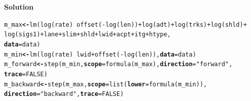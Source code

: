 \documentclass[12pt,oneside,a4paper]{article}\usepackage[]{graphicx}\usepackage[]{xcolor}
\makeatletter
\newcommand{\hlnum}[1]{\textcolor[rgb]{0,0,0}{#1}}%
\newcommand{\hlstr}[1]{\textcolor[rgb]{0,0,1}{#1}}%
\newcommand{\hlopt}[1]{\textcolor[rgb]{0,0,0}{#1}}%
\newcommand{\hlstd}[1]{\textcolor[rgb]{0,0,0}{#1}}%
\newcommand{\hlkwb}[1]{\textcolor[rgb]{0.498,0,0.333}{\textbf{#1}}}%
\newcommand{\hlkwc}[1]{\textcolor[rgb]{0.498,0,0.333}{\textbf{#1}}}%
\newcommand{\hlkwd}[1]{\textcolor[rgb]{0,0,0}{#1}}%
\newenvironment{kframe}{%
 \def\at@end@of@kframe{}%
 \ifinner\ifhmode%
  \def\at@end@of@kframe{\end{minipage}}%
  \begin{minipage}{\columnwidth}%
 \fi\fi%
 \def\FrameCommand##1{\hskip\@totalleftmargin \hskip-\fboxsep
 \colorbox{shadecolor}{##1}\hskip-\fboxsep
     \hskip-\linewidth \hskip-\@totalleftmargin \hskip\columnwidth}%
 \MakeFramed {\advance\hsize-\width
   \@totalleftmargin\z@ \linewidth\hsize
   \@setminipage}}%
 {\par\unskip\endMakeFramed%
 \at@end@of@kframe}
\newenvironment{knitrout}{}{} %
\newcommand{\solution}
{
    \vspace{15pt}
    \noindent\ignorespaces\textbf{\large Solution}\par
}
\makeatother
\begin{document}
\solution
\begin{knitrout}
\color{fgcolor}\begin{kframe}
\begin{alltt}
\hlstd{m_max} \hlkwb{<-} \hlkwd{lm}\hlstd{(}\hlkwd{log}\hlstd{(rate)} \hlopt{~} \hlkwd{offset}\hlstd{(}\hlopt{-}\hlkwd{log}\hlstd{(len))} \hlopt{+} \hlkwd{log}\hlstd{(adt)} \hlopt{+} \hlkwd{log}\hlstd{(trks)} \hlopt{+} \hlkwd{log}\hlstd{(shld)} \hlopt{+}
                \hlkwd{log}\hlstd{(sigs1)} \hlopt{+} \hlstd{lane} \hlopt{+} \hlstd{slim} \hlopt{+} \hlstd{shld} \hlopt{+} \hlstd{lwid} \hlopt{+} \hlstd{acpt} \hlopt{+} \hlstd{itg} \hlopt{+} \hlstd{htype,}
            \hlkwc{data} \hlstd{= data)}
\hlstd{m_min} \hlkwb{<-} \hlkwd{lm}\hlstd{(}\hlkwd{log}\hlstd{(rate)} \hlopt{~} \hlstd{lwid} \hlopt{+} \hlkwd{offset}\hlstd{(}\hlopt{-}\hlkwd{log}\hlstd{(len)),} \hlkwc{data} \hlstd{= data)}
\hlstd{m_forward} \hlkwb{<-} \hlkwd{step}\hlstd{(m_min,} \hlkwc{scope} \hlstd{=} \hlkwd{formula}\hlstd{(m_max),} \hlkwc{direction} \hlstd{=} \hlstr{"forward"}\hlstd{,}
                  \hlkwc{trace} \hlstd{=} \hlnum{FALSE}\hlstd{)}
\hlstd{m_backward} \hlkwb{<-} \hlkwd{step}\hlstd{(m_max,} \hlkwc{scope} \hlstd{=} \hlkwd{list}\hlstd{(}\hlkwc{lower} \hlstd{=} \hlkwd{formula}\hlstd{(m_min)),}
                   \hlkwc{direction} \hlstd{=} \hlstr{"backward"}\hlstd{,} \hlkwc{trace} \hlstd{=} \hlnum{FALSE}\hlstd{)}


\end{alltt}
\end{kframe}
\end{knitrout}
\end{document}

